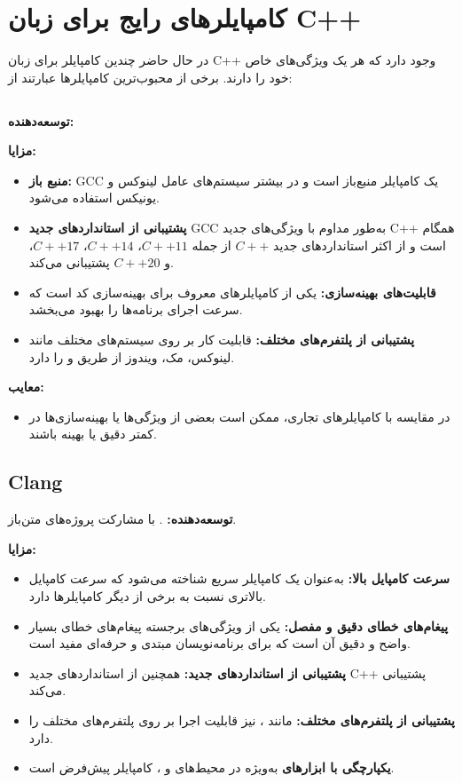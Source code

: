 \documentclass[12pt, a4paper]{report}
\begin{document}
\section{ کامپایلرهای رایج برای زبان C++}
در حال حاضر چندین کامپایلر برای زبان C++ وجود دارد که هر یک ویژگی‌های خاص خود را دارند. برخی از محبوب‌ترین کامپایلرها عبارتند از:

\subsection{}
\textbf{توسعه‌دهنده:} 

\textbf{مزایا:}
\begin{itemize}
	\item \textbf{منبع باز:} GCC یک کامپایلر منبع‌باز است و در بیشتر سیستم‌های عامل لینوکس و یونیکس استفاده می‌شود.
	\item \textbf{پشتیبانی از استانداردهای جدید } GCC به‌طور مداوم با ویژگی‌های جدید C++ همگام است و از اکثر استانداردهای جدید \( C++ \) از جمله \( C++11 \)، \( C++14 \)، \( C++17 \)، و \( C++20 \) پشتیبانی می‌کند.
	\item \textbf{قابلیت‌های بهینه‌سازی:}  یکی از کامپایلرهای معروف برای بهینه‌سازی کد است که سرعت اجرای برنامه‌ها را بهبود می‌بخشد.
	\item \textbf{پشتیبانی از پلتفرم‌های مختلف:}  قابلیت کار بر روی سیستم‌های مختلف مانند لینوکس، مک، ویندوز از طریق  و  را دارد.
\end{itemize}

\textbf{معایب:}
\begin{itemize}
	\item در مقایسه با کامپایلرهای تجاری، ممکن است بعضی از ویژگی‌ها یا بهینه‌سازی‌ها در  کمتر دقیق یا بهینه باشند.
\end{itemize}

\subsection{Clang}
\textbf{توسعه‌دهنده:} . با مشارکت پروژه‌های متن‌باز.

\textbf{مزایا:}
\begin{itemize}
	\item \textbf{سرعت کامپایل بالا:}  به‌عنوان یک کامپایلر سریع شناخته می‌شود که سرعت کامپایل بالاتری نسبت به برخی از دیگر کامپایلرها دارد.
	\item \textbf{پیغام‌های خطای دقیق و مفصل:} یکی از ویژگی‌های برجسته  پیغام‌های خطای بسیار واضح و دقیق آن است که برای برنامه‌نویسان مبتدی و حرفه‌ای مفید است.
	\item \textbf{پشتیبانی از استانداردهای جدید:}  همچنین از استانداردهای جدید C++ پشتیبانی می‌کند.
	\item \textbf{پشتیبانی از پلتفرم‌های مختلف:} مانند ، نیز قابلیت اجرا بر روی پلتفرم‌های مختلف را دارد.
	\item \textbf{یکپارچگی با ابزارهای } به‌ویژه در محیط‌های  و ،  کامپایلر پیش‌فرض است.
\end{itemize}
\end{document}
